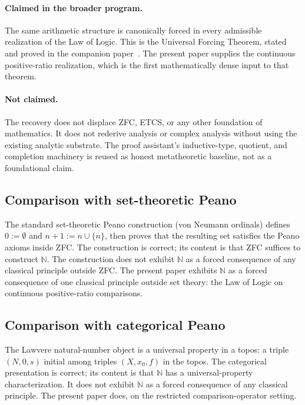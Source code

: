 \documentclass[11pt,a4paper]{article}
\theoremstyle{definition}
\theoremstyle{remark}
\begin{document}
\paragraph{Claimed in the broader program.} The same arithmetic
structure is canonically forced in every admissible realization of
the Law of Logic. This is the Universal Forcing Theorem, stated and
proved in the companion paper~\cite{Washburn2026UniversalForcing}.
The present paper supplies the continuous positive-ratio realization,
which is the first mathematically dense input to that theorem.

\paragraph{Not claimed.} The recovery does not displace ZFC, ETCS, or
any other foundation of mathematics. It does not rederive analysis or
complex analysis without using the existing analytic substrate. The
proof assistant's inductive-type, quotient, and completion machinery
is reused as honest metatheoretic baseline, not as a foundational
claim.

\subsection{Comparison with set-theoretic Peano}

The standard set-theoretic Peano construction (von Neumann ordinals)
defines $0 := \emptyset$ and $n + 1 := n \cup \{n\}$, then proves
that the resulting set satisfies the Peano axioms inside ZFC. The
construction is correct; its content is that ZFC suffices to
construct $\mathbb{N}$. The construction does not exhibit $\mathbb{N}$
as a forced consequence of any classical principle outside ZFC. The
present paper exhibits $\mathbb{N}$ as a forced consequence of one
classical principle outside set theory: the Law of Logic on continuous
positive-ratio comparisons.

\subsection{Comparison with categorical Peano}

The Lawvere natural-number object is a universal property in a
topos: a triple $(N, 0, s)$ initial among triples $(X, x_0, f)$ in the
topos. The categorical presentation is correct; its content is that
$\mathbb{N}$ has a universal-property characterization. It does not
exhibit $\mathbb{N}$ as a forced consequence of any classical principle.
The present paper does, on the restricted comparison-operator setting.
\end{document}
